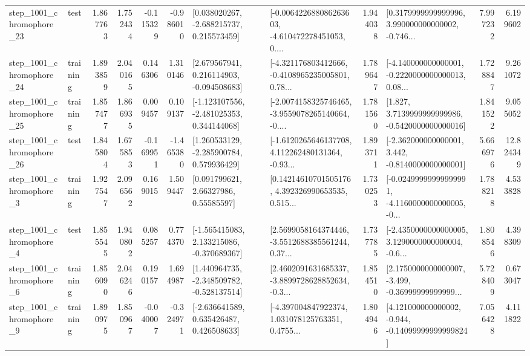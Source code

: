 \begin{tabular}{llrrrrllrlrr}
 step\_1001\_chromophore\_23 &      test &      1.867763 &    1.752434 &     -0.115329 & -0.986010 &    [0.038020267, -2.688215737, 0.215573459] &  [-0.006422688086263603, -4.610472278451053, 0.... &       1.944038 &  [0.3179999999999996, 3.990000000000002, -0.746... &            7.997232 &          6.199602 \\
 step\_1001\_chromophore\_24 &  training &      1.893859 &    2.040165 &      0.146306 &  1.310146 &    [2.679567941, 0.216114903, -0.094508683] &  [-4.321176803412666, -0.4108965235005801, 0.78... &       1.789647 &  [-4.140000000000001, -0.2220000000000013, 0.08... &            1.728847 &          9.261072 \\
 step\_1001\_chromophore\_25 &  training &      1.857477 &    1.866935 &      0.009457 &  0.109137 &   [-1.123107556, -2.481025353, 0.344144068] &  [-2.0074158325746465, -3.9559078265140664, -0.... &       1.781560 &   [1.827, 3.7139999999999986, -0.5420000000000016] &            1.841522 &          9.055052 \\
 step\_1001\_chromophore\_26 &      test &      1.845804 &    1.675853 &     -0.169951 & -1.465380 &    [1.260533129, -2.285900784, 0.579936429] &  [-1.6120265646137708, 4.112262480131364, -0.93... &       1.893711 &   [-2.362000000000001, 3.442, -0.8140000000000001] &            5.666976 &         12.824349 \\
  step\_1001\_chromophore\_3 &  training &      1.927547 &    2.096562 &      0.169015 &  1.509447 &       [0.091799621, 2.66327986, 0.55585597] &  [0.14214610701505176, 4.392326990653535, 0.515... &       1.730253 &  [-0.02499999999999991, -4.1160000000000005, -0... &            1.788218 &          4.533828 \\
  step\_1001\_chromophore\_4 &      test &      1.855545 &    1.940802 &      0.085257 &  0.774370 &   [-1.565415083, 2.133215086, -0.370689367] &  [2.5699058164374446, -3.5512688385561244, 0.37... &       1.737785 &  [-2.4350000000000005, 3.1290000000000004, -0.6... &            1.808546 &          4.398309 \\
  step\_1001\_chromophore\_6 &  training &      1.856090 &    2.046246 &      0.190157 &  1.694987 &   [1.440964735, -2.348509782, -0.528137514] &  [2.4602091631685337, -3.8899728628852634, -0.3... &       1.854510 &  [2.1750000000000007, -3.499, -0.36999999999999... &            5.728409 &          0.673047 \\
  step\_1001\_chromophore\_9 &  training &      1.890975 &    1.850967 &     -0.040007 & -0.324971 &    [-2.636641589, 0.635426487, 0.426508633] &  [-4.397004847922374, 1.031078125763351, 0.4755... &       1.804946 &  [4.121000000000002, -0.944, -0.14099999999999824] &            7.056428 &          4.111822 \\

\end{tabular}
